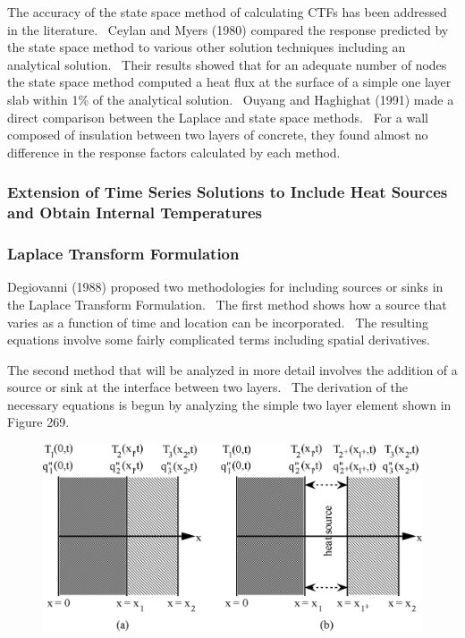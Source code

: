 The accuracy of the state space method of calculating CTFs has been addressed in the literature.~ Ceylan and Myers (1980) compared the response predicted by the state space method to various other solution techniques including an analytical solution.~ Their results showed that for an adequate number of nodes the state space method computed a heat flux at the surface of a simple one layer slab within 1\% of the analytical solution.~ Ouyang and Haghighat (1991) made a direct comparison between the Laplace and state space methods.~ For a wall composed of insulation between two layers of concrete, they found almost no difference in the response factors calculated by each method.

\subsubsection{Extension of Time Series Solutions to Include Heat Sources and Obtain Internal Temperatures}\label{extension-of-time-series-solutions-to-include-heat-sources-and-obtain-internal-temperatures}

\subsubsection{Laplace Transform Formulation}\label{laplace-transform-formulation-1}

Degiovanni (1988) proposed two methodologies for including sources or sinks in the Laplace Transform Formulation.~ The first method shows how a source that varies as a function of time and location can be incorporated.~ The resulting equations involve some fairly complicated terms including spatial derivatives.

The second method that will be analyzed in more detail involves the addition of a source or sink at the interface between two layers.~ The derivation of the necessary equations is begun by analyzing the simple two layer element shown in Figure 269.

\begin{figure}[htbp]
\centering
\includegraphics{media/image6009.png}
\caption{}
\end{figure}

